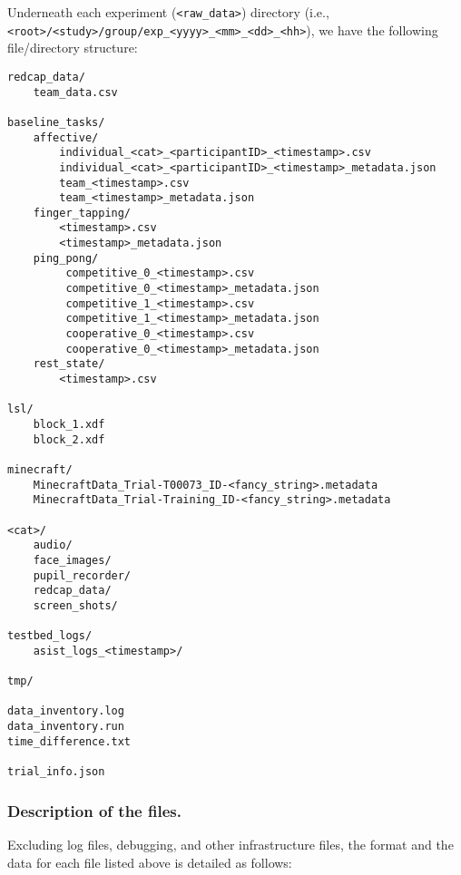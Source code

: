 

Underneath each experiment (\verb|<raw_data>|) directory (i.e.,\\
\verb|<root>/<study>/group/exp_<yyyy>_<mm>_<dd>_<hh>|), we have the following
file/directory structure:
%
\begin{verbatim}
redcap_data/
    team_data.csv

baseline_tasks/
    affective/
        individual_<cat>_<participantID>_<timestamp>.csv
        individual_<cat>_<participantID>_<timestamp>_metadata.json
        team_<timestamp>.csv
        team_<timestamp>_metadata.json
    finger_tapping/
        <timestamp>.csv
        <timestamp>_metadata.json
    ping_pong/
         competitive_0_<timestamp>.csv
         competitive_0_<timestamp>_metadata.json
         competitive_1_<timestamp>.csv
         competitive_1_<timestamp>_metadata.json
         cooperative_0_<timestamp>.csv
         cooperative_0_<timestamp>_metadata.json
    rest_state/
        <timestamp>.csv

lsl/
    block_1.xdf
    block_2.xdf

minecraft/
    MinecraftData_Trial-T00073_ID-<fancy_string>.metadata
    MinecraftData_Trial-Training_ID-<fancy_string>.metadata

<cat>/
    audio/
    face_images/
    pupil_recorder/
    redcap_data/
    screen_shots/

testbed_logs/
    asist_logs_<timestamp>/

tmp/

data_inventory.log
data_inventory.run
time_difference.txt

trial_info.json
\end{verbatim}

\subsubsection{Description of the files.}

\noindent
Excluding log files, debugging, and other infrastructure files, the format and
the data for each file listed
above is detailed as follows: \\


